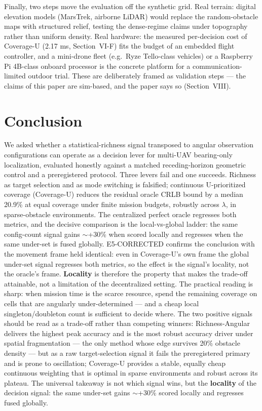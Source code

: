 \documentclass[journal]{IEEEtran}
\newcommand{\CU}{Coverage-U}
\newcommand{\RA}{Richness-Angular}
\begin{document}
Finally, two steps move the evaluation off the synthetic grid. Real terrain:
digital elevation models (MarsTrek, airborne LiDAR) would replace the
random-obstacle maps with structured relief, testing the dense-regime claims
under topography rather than uniform density. Real hardware: the measured
per-decision cost of \CU{} (2.17 ms, Section~VI-F) fits the budget of an
embedded flight controller, and a mini-drone fleet (e.g.\ Ryze Tello-class
vehicles) or a Raspberry Pi 4B-class onboard processor is the concrete platform
for a communication-limited outdoor trial. These are deliberately framed as
validation steps --- the claims of this paper are sim-based, and the paper says
so (Section~VIII).

\section{Conclusion}
We asked whether a statistical-richness signal transposed to angular
observation configurations can operate as a decision lever for multi-UAV
bearing-only localization, evaluated honestly against a matched receding-horizon
geometric control and a preregistered protocol. Three levers fail and one
succeeds. Richness as target selection and as mode switching is falsified;
continuous U-prioritized coverage (\CU) reduces the residual oracle CRLB bound
by a median 20.9\% at equal coverage under finite mission budgets, robustly
across $\lambda$, in sparse-obstacle environments. The centralized perfect
oracle regresses both metrics, and the decisive comparison is the
local-vs-global ladder: the same config-count signal gains $\sim$+30\% when
scored locally and regresses when the same under-set is fused globally.
E5-CORRECTED confirms the conclusion with the movement frame held identical:
even in \CU's{} own frame the global under-set signal regresses both metrics,
so the effect is the signal's locality, not the oracle's frame.
\textbf{Locality} is therefore the property that makes the trade-off attainable,
not a limitation of the decentralized setting. The practical reading is sharp:
when mission time is the scarce resource, spend the remaining coverage on cells
that are angularly under-determined --- and a cheap local singleton/doubleton
count is sufficient to decide where. The two positive signals should be read as
a trade-off rather than competing winners: \RA{} delivers the highest peak
accuracy and is the most robust accuracy driver under spatial fragmentation ---
the only method whose edge survives 20\% obstacle density --- but as a raw
target-selection signal it fails the preregistered primary and is prone to
oscillation; \CU{} provides a stable, equally cheap continuous weighting that is
optimal in sparse environments and robust across its plateau. The universal
takeaway is not which signal wins, but the \textbf{locality} of the decision
signal: the same under-set gains $\sim$+30\% scored locally and regresses fused
globally.
\end{document}
